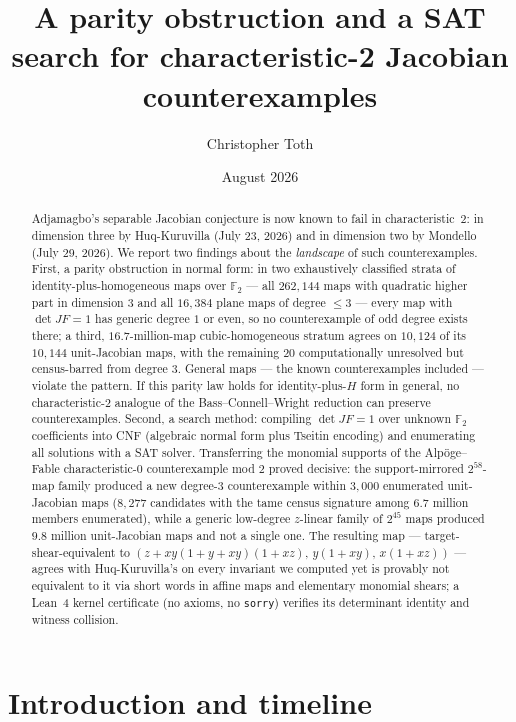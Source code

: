 \documentclass[11pt]{amsart}
\title[Parity obstruction and SAT search in characteristic 2]{A parity
obstruction and a SAT search for characteristic-2 Jacobian
counterexamples}
\author{Christopher Toth}
\date{August 2026}
\newcommand{\F}{\mathbb{F}}
\begin{document}
\begin{abstract}
Adjamagbo's separable Jacobian conjecture is now known to fail in
characteristic~$2$: in dimension three by Huq-Kuruvilla (July 23, 2026)
and in dimension two by Mondello (July 29, 2026). We report two
findings about the \emph{landscape} of such counterexamples. First, a
parity obstruction in normal form: in two exhaustively classified
strata of identity-plus-homogeneous maps over $\F_2$ --- all $262{,}144$
maps with quadratic higher part in dimension $3$ and all $16{,}384$
plane maps of degree $\le 3$ --- every map with $\det JF = 1$ has
generic degree $1$ or even, so no counterexample of odd degree exists
there; a third, $16.7$-million-map cubic-homogeneous stratum agrees on
$10{,}124$ of its $10{,}144$ unit-Jacobian maps, with the remaining
$20$ computationally unresolved but census-barred from degree $3$.
General maps --- the known counterexamples included --- violate the
pattern. If this parity law holds
for identity-plus-$H$ form in general, no characteristic-$2$ analogue of
the Bass--Connell--Wright reduction can preserve counterexamples.
Second, a search method: compiling $\det JF = 1$ over unknown $\F_2$
coefficients into CNF (algebraic normal form plus Tseitin encoding) and
enumerating all solutions with a SAT solver. Transferring the monomial
supports of the Alp\"oge--Fable characteristic-$0$ counterexample mod
$2$ proved decisive: the support-mirrored $2^{58}$-map family produced a
new degree-$3$ counterexample within $3{,}000$ enumerated unit-Jacobian
maps ($8{,}277$ candidates with the tame census signature among
$6.7$ million members enumerated), while a generic low-degree
$z$-linear family of $2^{45}$ maps produced $9.8$ million unit-Jacobian
maps and not a single one. The
resulting map --- target-shear-equivalent to
$(z + xy(1{+}y{+}xy)(1{+}xz),\, y(1{+}xy),\, x(1{+}xz))$ --- agrees with
Huq-Kuruvilla's on every invariant we computed yet is provably not
equivalent to it via short words in affine maps and elementary monomial
shears; a Lean~4 kernel certificate (no axioms, no \texttt{sorry})
verifies its determinant identity and witness collision.
\end{abstract}

\maketitle

\section{Introduction and timeline}
\end{document}
